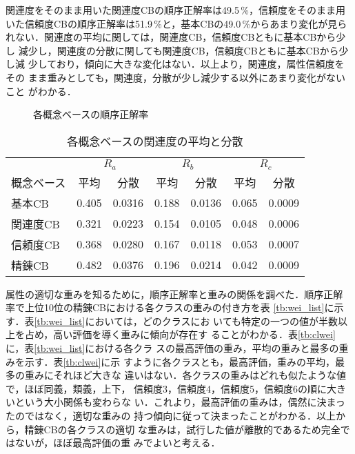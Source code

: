 関連度をそのまま用いた関連度CBの順序正解率は49.5\,\%，信頼度をそのまま用
いた信頼度CBの順序正解率は51.9\,\%と，基本CBの49.0\,\%からあまり変化が見ら
れない．関連度の平均に関しては，関連度CB，信頼度CBともに基本CBから少し
減少し，関連度の分散に関しても関連度CB，信頼度CBともに基本CBから少し減
少しており，傾向に大きな変化はない．以上より，関連度，属性信頼度をその
まま重みとしても，関連度，分散が少し減少する以外にあまり変化がないこと
がわかる．

\begin{figure}[ht]
  \begin{center}
    \caption{各概念ベースの順序正解率}
    \label{fig:ror}
  \end{center}
\end{figure}

\begin{table}[ht]
  \begin{center}
    \caption{各概念ベースの関連度の平均と分散}
    \label{tb:cb_da}
    \begin{tabular}{l|cc|cc|cc}
      \hline
      \multicolumn{1}{c|}{} & \multicolumn{2}{c|}{$R_a$} &
        \multicolumn{2}{c|}{$R_b$} & \multicolumn{2}{c}{$R_c$} \\
      概念ベース & 平均 & 分散 & 平均 & 分散 & 平均 & 分散 \\
      \hline
      基本CB   & 0.405 & 0.0316 & 0.188 & 0.0136 & 0.065 & 0.0009 \\
      関連度CB & 0.321 & 0.0223 & 0.154 & 0.0105 & 0.048 & 0.0006 \\
      信頼度CB & 0.368 & 0.0280  & 0.167 & 0.0118  & 0.053 & 0.0007 \\
      精錬CB   & 0.482 & 0.0376  & 0.196 & 0.0214  & 0.042 & 0.0009 \\
      \hline
    \end{tabular}
  \end{center}
\end{table}

属性の適切な重みを知るために，順序正解率と重みの関係を調べた．順序正解
率で上位10位の精錬CBにおける各クラスの重みの付き方を表
\ref{tb:wei_list}に示す．表\ref{tb:wei_list}においては，どのクラスにお
いても特定の一つの値が半数以上を占め，高い評価を導く重みに傾向が存在す
ることがわかる．表\ref{tb:clwei}に，表\ref{tb:wei_list}における各クラ
スの最高評価の重み，平均の重みと最多の重みを示す．表\ref{tb:clwei}に示
すように各クラスとも，最高評価，重みの平均，最多の重みにそれほど大きな
違いはない．各クラスの重みはどれも似たような値で，ほぼ同義，類義，上下，
信頼度3，信頼度4，信頼度5，信頼度6の順に大きいという大小関係も変わらな
い．これより，最高評価の重みは，偶然に決まったのではなく，適切な重みの
持つ傾向に従って決まったことがわかる．以上から，精錬CBの各クラスの適切
な重みは，試行した値が離散的であるため完全ではないが，ほぼ最高評価の重
みでよいと考える．

